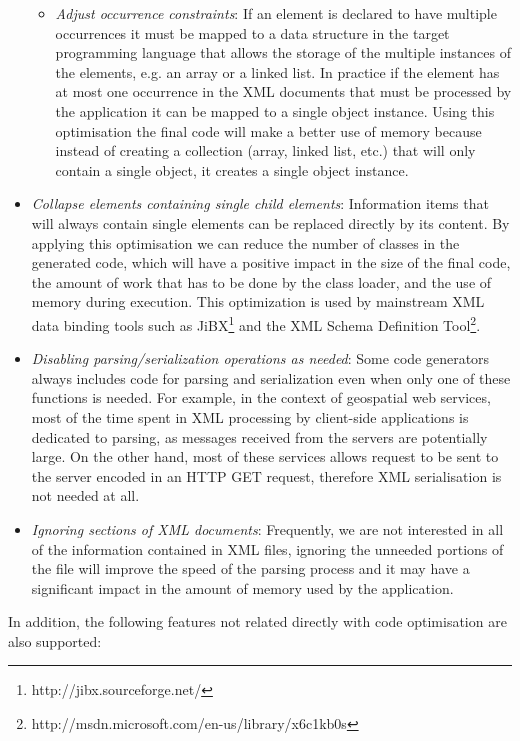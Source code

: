 \documentclass{sig-alternate}
\begin{document}
\begin{sloppypar}
\begin{itemize}
\begin{itemize}
			\item \textit{Adjust occurrence constraints}: If an element is declared to have multiple occurrences it must be mapped to a data structure in the target programming language that allows the storage of the multiple instances of the elements, e.g. an array or a linked list. In practice if the element has at most one occurrence in the XML documents that must be processed by the application it can be mapped to a single object instance. Using this optimisation the final code will make a better use of memory because  instead of creating a collection (array, linked list, etc.) that will only contain a single object, it  creates a single object instance.
\end{itemize}
\item \textit{Collapse elements containing single child elements}: Information items that will always contain single elements can be replaced directly by its content. By applying this optimisation we can reduce the number of classes in the generated code, which will have a positive impact in the size of the final code, the amount of work that has to be done by the class loader, and the use of memory during execution. This optimization is used by mainstream XML data binding tools such as JiBX\footnote{http://jibx.sourceforge.net/} and the XML Schema Definition Tool\footnote{http://msdn.microsoft.com/en-us/library/x6c1kb0s}.
\item \textit{Disabling parsing/serialization operations as needed}: Some code generators always includes code for parsing and serialization even when only one of these functions is needed. For example, in the context of geospatial web services, most of the time spent in XML processing by client-side applications is dedicated to parsing, as messages received from the servers are potentially large. On the other hand,  most of these services allows request to be sent to the server encoded in an HTTP GET request, therefore XML serialisation is not needed at all.
\item \textit{Ignoring sections of XML documents}: Frequently, we are not interested in all of the information contained in XML files, ignoring the unneeded portions of the file will improve the speed of the parsing process and it may have a significant impact in the amount of memory used by the application.
\end{itemize}
\end{sloppypar}

In addition, the following features not related directly with code optimisation are also supported:
\end{document}
